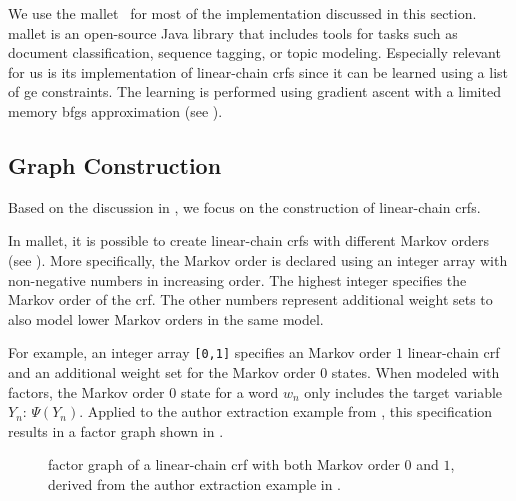 We use the \acrfull{mallet}~\citep{mccallum2002mallet} for most of the implementation discussed in this section.
\gls{mallet} is an open-source Java library that includes tools for tasks such as document classification, sequence tagging, or topic modeling.
Especially relevant for us is its implementation of \glspl{linear-chain crf} since it can be learned using a list of \gls{ge} constraints.
The learning is performed using gradient ascent with a limited memory \gls{bfgs} approximation (see ).

\subsection{Graph Construction}\label{subsec:i-graph-construction}

Based on the discussion in , we focus on the construction of \glspl{linear-chain crf}.

In \gls{mallet}, it is possible to create \glspl{linear-chain crf} with different Markov orders (see ).
More specifically, the Markov order is declared using an integer array with non-negative numbers in increasing order.
The highest integer specifies the Markov order of the \gls{crf}.
The other numbers represent additional weight sets to also model lower Markov orders in the same model.

For example, an integer array \texttt{[0,1]} specifies an Markov order $1$ \gls{linear-chain crf} and an additional weight set for the Markov order $0$ states.
When modeled with \glspl{factor}, the Markov order $0$ state for a word $w_n$ only includes the \gls{target variable} $Y_n$: $\Psi(Y_n)$.
Applied to the author extraction example from , this specification results in a \gls{factor graph} shown in .
\begin{figure}[t]
\centering

\caption{%
  \Gls{factor graph} of a \gls{linear-chain crf} with both Markov order $0$ and $1$, derived from the author extraction example in .}
\label{fig:example-linear-chain-crf-markov-order-0-1}
\end{figure}

